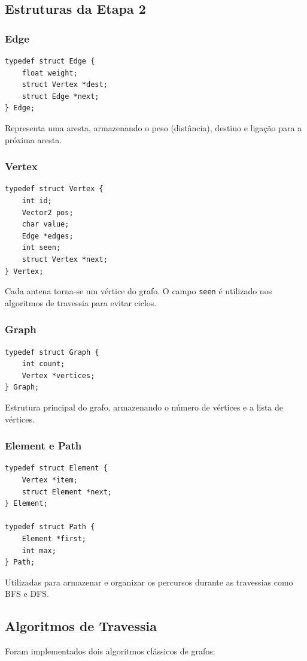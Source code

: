 \documentclass[a4paper,12pt]{article}
\begin{document}
\subsection{Estruturas da Etapa 2}
\subsubsection{Edge}
\begin{lstlisting}[style=CStyle]
typedef struct Edge {
    float weight;
    struct Vertex *dest;
    struct Edge *next;
} Edge;
\end{lstlisting}
Representa uma aresta, armazenando o peso (distância), destino e ligação para a próxima aresta.

\subsubsection{Vertex}
\begin{lstlisting}[style=CStyle]
typedef struct Vertex {
    int id;
    Vector2 pos;
    char value;
    Edge *edges;
    int seen;
    struct Vertex *next;
} Vertex;
\end{lstlisting}
Cada antena torna-se um vértice do grafo. O campo \texttt{seen} é utilizado nos algoritmos de travessia para evitar ciclos.

\subsubsection{Graph}
\begin{lstlisting}[style=CStyle]
typedef struct Graph {
    int count;
    Vertex *vertices;
} Graph;
\end{lstlisting}
Estrutura principal do grafo, armazenando o número de vértices e a lista de vértices.

\subsubsection{Element e Path}
\begin{lstlisting}[style=CStyle]
typedef struct Element {
    Vertex *item;
    struct Element *next;
} Element;

typedef struct Path {
    Element *first;
    int max;
} Path;
\end{lstlisting}
Utilizadas para armazenar e organizar os percursos durante as travessias como BFS e DFS.

\subsection{Algoritmos de Travessia}
Foram implementados dois algoritmos clássicos de grafos:
\end{document}
